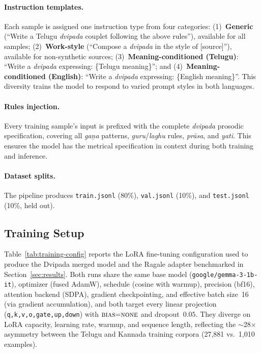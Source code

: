 \documentclass[11pt]{article}
\begin{document}
\paragraph{Instruction templates.}
Each sample is assigned one instruction type from four categories:
(1)~\textbf{Generic} (``Write a Telugu \textit{dvipada} couplet following
the above rules''), available for all samples;
(2)~\textbf{Work-style} (``Compose a \textit{dvipada} in the style of
[source]''), available for non-synthetic sources;
(3)~\textbf{Meaning-conditioned (Telugu)}: ``Write a \textit{dvipada}
expressing: \{Telugu meaning\}''; and
(4)~\textbf{Meaning-conditioned (English)}: ``Write a \textit{dvipada}
expressing: \{English meaning\}''.
This diversity trains the model to respond to varied prompt styles in both
languages.

\paragraph{Rules injection.}
Every training sample's input is prefixed with the complete \textit{dvipada}
prosodic specification, covering all \textit{ga\d{n}a} patterns,
\textit{guru}/\textit{laghu} rules, \textit{pr\={a}sa}, and \textit{yati}.
This ensures the model has the metrical specification in context during both
training and inference.

\paragraph{Dataset splits.}
The pipeline produces \texttt{train.jsonl} (80\%), \texttt{val.jsonl} (10\%),
and \texttt{test.jsonl} (10\%, held out).

\subsection{Training Setup}
\label{sec:training_setup}

Table~\ref{tab:training-config} reports the LoRA fine-tuning configuration
used to produce the Dvipada merged model and the Ragale adapter benchmarked
in Section~\ref{sec:results}. Both runs share the same base model
(\texttt{google/gemma-3-1b-it}), optimizer (fused AdamW), schedule
(cosine with warmup), precision (bf16), attention backend (SDPA),
gradient checkpointing, and effective batch size~16 (via gradient
accumulation), and both target every linear projection
(\texttt{q,k,v,o,gate,up,down}) with $\textsc{bias}{=}\textsc{none}$
and dropout~$0.05$. They diverge on LoRA capacity, learning rate, warmup,
and sequence length, reflecting the $\sim$28$\times$ asymmetry between
the Telugu and Kannada training corpora (27{,}881 vs.\ 1{,}010
examples).
\end{document}
